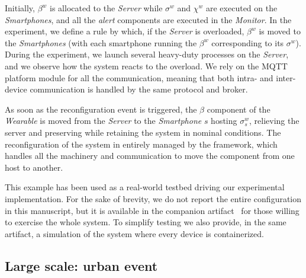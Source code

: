 \documentclass[conference]{IEEEtran}
\newcommand{\meta}[1]{{\color{blue}#1}}
\begin{document}
Initially, $\beta^{w}$ is allocated to the \emph{Server} while
$\sigma^{w}$ and $\chi^{w}$ are executed on the \emph{Smartphones},
and all the \emph{alert} components are executed in the \emph{Monitor}.
%
In the experiment,
we define a rule by which,
if the \emph{Server} is overloaded,
$\beta^{w}$ is moved to the \emph{Smartphones}
(with each smartphone running the $\beta^{w}$ corresponding to its $\sigma^{w}$).
%
During the experiment,
we launch several heavy-duty processes on the \emph{Server},
and we observe how the system reacts to the overload.
%
We rely on the MQTT platform module for all the communication,
meaning that both intra- and inter-device communication is handled by the same protocol and broker.

As soon as the reconfiguration event is triggered,
the $\beta$ component of the \emph{Wearable} is moved from the \emph{Server} to the \emph{Smartphone} $s$ hosting $\sigma^{w}_{s}$,
relieving the server and preserving while retaining the system in nominal conditions.
%
The reconfiguration of the system in entirely managed by the framework,
which handles all the machinery and communication to move the component from
one host to another.

This example has been used as a real-world testbed driving our experimental implementation.
%
For the sake of brevity,
we do not report the entire configuration in this manuscript, but it is available in the companion artifact~\cite{https://doi.org/10.5281/zenodo.7933160}
for those willing to exercise the whole system.
%
To simplify testing we also provide,
in the same artifact,
a simulation of the system where every device is containerized.

\subsection{Large scale: urban event}
\end{document}
